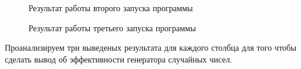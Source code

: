 \documentclass[14pt, a4paper]{extarticle}
\begin{document}
\begin{figure}[H]
\caption{Результат работы второго запуска программы}
\label{fig:pic2}
\end{figure}

\begin{figure}[H]
\caption{Результат работы третьего запуска программы}
\label{fig:pic3}
\end{figure}

Проанализируем три выведеных результата для каждого столбца для того чтобы сделать вывод об эффективности генератора случайных чисел.
\end{document}
